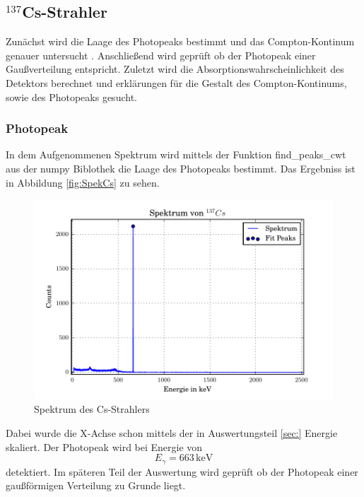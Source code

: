 \subsection{$^{137}$Cs-Strahler}
Zunächst wird die Laage des Photopeaks bestimmt und das Compton-Kontinum genauer untersucht . Anschließend wird geprüft ob der Photopeak einer Gaußverteilung entspricht. Zuletzt wird die Absorptionswahrscheinlichkeit des Detektors berechnet und erklärungen für die Gestalt des Compton-Kontinums, sowie des Photopeaks gesucht.
\subsubsection{Photopeak}
In dem Aufgenommenen Spektrum wird mittels der Funktion find\_peaks\_cwt aus der numpy Biblothek die Laage des Photopeaks bestimmt. Das Ergebniss ist in Abbildung \ref{fig:SpekCs} zu sehen. 
\begin{figure}
  \centering
  \includegraphics[width=\textwidth]{./build/SpektCS.pdf}
  \caption{Spektrum des Cs-Strahlers}
  \label{fig:SpekCS}
\end{figure}
Dabei wurde die X-Achse schon mittels der in Auswertungsteil \ref{sec:} Energie skaliert. Der Photopeak wird bei Energie von 
\begin{equation}
  E_\gamma = 663 \, \text{keV}
  \label{eqn:CsPhoto}
\end{equation} 
detektiert. Im späteren Teil der Auswertung wird geprüft ob der Photopeak einer gaußförmigen Verteilung zu Grunde liegt.

